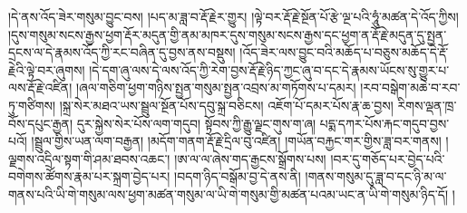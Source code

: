 །དེ་ནས་འོད་ཟེར་གསུམ་བྱུང་བས། །པད་མ་ཟླ་བ་རྡོ་རྗེར་གྱུར། །ལྟེ་བར་རྡོ་རྗེ་སྔོན་པོ་རྩེ་ལྔ་པའི་ཧཱུཾ་མཚན་དེ་འོད་ཀྱིས། །དུས་གསུམ་སངས་རྒྱས་ཕྱག་རྡོར་མདུན་གྱི་ནམ་མཁར་དུས་གསུམ་སངས་རྒྱས་དང་ཕྱག་ན་རྡོ་རྗེ་མདུན་དུ་སྤྱན་དྲངས་ལ་དེ་རྣམས་འོད་ཀྱི་རང་བཞིན་དུ་བྱས་ནས་བསྡུས། །འོད་ཟེར་ལས་བྱུང་བའི་མཆོད་པ་བཅུས་མཆོད་དེ་རྡོ་རྗེའི་ལྟེ་བར་ཞུགས། །དེ་དག་ཞུ་ལས་དེ་ལས་འོད་ཀྱི་རེག་བྱས་རྡོ་རྗེ་ཉིད་ཀྱང་ཞུ་བ་དང་དེ་རྣམས་ཡོངས་སུ་གྱུར་པ་ལས་རྡོ་རྗེ་འཛིན། །ཞལ་གཅིག་ཕྱག་གཉིས་སྤྱན་གསུམ་སྤྱན་འབྲས་མ་གཏོགས་པ་དམར། །རབ་བསྒེག་མཆེ་བ་རབ་ཏུ་གཙིགས། །སྐྲ་སེར་མཐའ་ཡས་སྦྲུལ་སྔོན་པོས་དབུ་སྐྲ་བཅིངས། འཇོག་པོ་དམར་པོས་རྣ་ཆ་བྱས། རིགས་ལྡན་ཁྲ་བོས་དཔུང་རྒྱན། དུར་སྐྱེས་སེར་པོས་ལག་གདུབ། སྟོབས་ཀྱི་རྒྱུ་ལྗང་གུས་ག་ཞ། པདྨ་དཀར་པོས་རྐང་གདུབ་བྱས་པའོ། །སྦྲུལ་གྱིས་ཡན་ལག་བརྒྱན། །མདོག་གནག་རྡོ་རྗེ་དྲིལ་བུ་འཛིན། །གཡོན་བརྐྱང་གར་གྱིས་ཟླ་བར་གནས། །ལྗགས་འདྲིལ་སྟག་གི་ཤམ་ཐབས་འཆང་། །ཨ་ལ་ལ་ཞེས་གད་རྒྱངས་སྒྲོགས་པས། །བར་དུ་གཅོད་པར་བྱེད་པའི་བགེགས་ཚོགས་རྣམ་པར་སྐྲག་བྱེད་པར། །བདག་ཉིད་བསྒོམ་བྱ་དེ་ནས་ནི། །གནས་གསུམ་དུ་ཟླ་བ་དང་ཉི་མ་ལ་གནས་པའི་ཡི་གེ་གསུམ་ལས་ཕྱག་མཚན་གསུམ་ལ་ཡི་གེ་གསུམ་གྱི་མཚན་པའམ་ཡང་ན་ཡི་གེ་གསུམ་ཉིད་དོ། །
